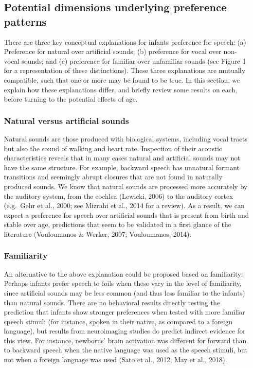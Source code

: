\documentclass[]{apa6}
\begin{document}
\subsection{Potential dimensions underlying preference
patterns}\label{potential-dimensions-underlying-preference-patterns}

There are three key conceptual explanations for infants preference for
speech: (a) Preference for natural over artificial sounds; (b)
preference for vocal over non-vocal sounds; and (c) preference for
familiar over unfamiliar sounds (see Figure 1 for a representation of
these distinctions). These three explanations are mutually compatible,
such that one or more may be found to be true. In this section, we
explain how these explanations differ, and briefly review some results
on each, before turning to the potential effects of age.

\subsubsection{Natural versus artificial
sounds}\label{natural-versus-artificial-sounds}

Natural sounds are those produced with biological systems, including
vocal tracts but also the sound of walking and heart rate. Inspection of
their acoustic characteristics reveals that in many cases natural and
artificial sounds may not have the same structure. For example, backward
speech has unnatural formant transitions and seemingly abrupt closures
that are not found in naturally produced sounds. We know that natural
sounds are processed more accurately by the auditory system, from the
cochlea (Lewicki, 2006) to the auditory cortex (e.g.~Gehr et al., 2000;
see Mizrahi et al., 2014 for a review). As a result, we can expect a
preference for speech over artificial sounds that is present from birth
and stable over age, predictions that seem to be validated in a first
glance of the literature (Vouloumanos \& Werker, 2007; Vouloumanos,
2014).

\subsubsection{Familiarity}\label{familiarity}

An alternative to the above explanation could be proposed based on
familiarity: Perhaps infants prefer speech to foils when these vary in
the level of familiarity, since artificial sounds may be less common
(and thus less familiar to the infants) than natural sounds. There are
no behavioral results directly testing the prediction that infants show
stronger preferences when tested with more familiar speech stimuli (for
instance, spoken in their native, as compared to a foreign language),
but results from neuroimaging studies do predict indirect evidence for
this view. For instance, newborns' brain activation was different for
forward than to backward speech when the native language was used as the
speech stimuli, but not when a foreign language was used (Sato et al.,
2012; May et al., 2018).
\end{document}
